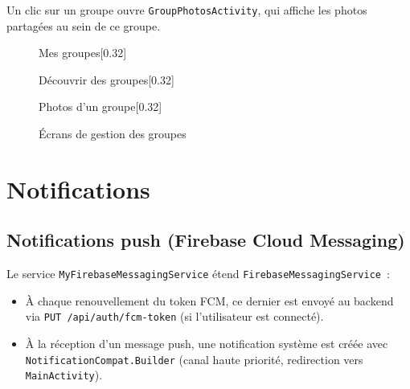 \documentclass[12pt, a4paper, openany]{report}
\begin{document}
Un clic sur un groupe ouvre \texttt{GroupPhotosActivity}, qui affiche les photos partagées
au sein de ce groupe.

\begin{figure}[H]
  \centering
  \begin{subcaptionbox}{Mes groupes\label{fig:groups_my}}[0.32\textwidth]
  \end{subcaptionbox}
  \hfill
  \begin{subcaptionbox}{Découvrir des groupes\label{fig:groups_discover}}[0.32\textwidth]
  \end{subcaptionbox}
  \hfill
  \begin{subcaptionbox}{Photos d'un groupe\label{fig:group_photos}}[0.32\textwidth]
  \end{subcaptionbox}
  \caption{Écrans de gestion des groupes}
  \label{fig:groups}
\end{figure}

\section{Notifications}

\subsection{Notifications push (Firebase Cloud Messaging)}

Le service \texttt{MyFirebaseMessagingService} étend \texttt{FirebaseMessagingService}~:
\begin{itemize}
  \item À chaque renouvellement du token FCM, ce dernier est envoyé au backend via
        \texttt{PUT /api/auth/fcm-token} (si l'utilisateur est connecté).
  \item À la réception d'un message push, une notification système est créée avec
        \texttt{NotificationCompat.Builder} (canal haute priorité, redirection vers
        \texttt{MainActivity}).
\end{itemize}
\end{document}
